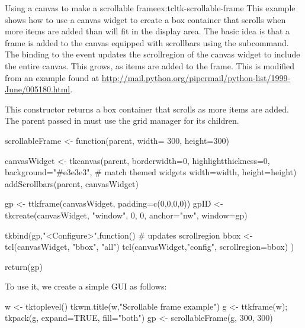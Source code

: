 \begin{example}{Using a canvas to make a scrollable frame}{ex:tcltk-scrollable-frame}
This example shows how to use a canvas widget to create a box
container that scrolls when more items are added than will fit in the
display area. The basic idea is that a frame is added to the canvas
equipped with scrollbars using the  subcommand. The binding to the 
event updates the scrollregion of the canvas widget to include the
entire canvas. This grows, as items are added to the frame. This is
modified from an example found at \url{
  http://mail.python.org/pipermail/python-list/1999-June/005180.html}.

This constructor returns a box container that scrolls as more items are added. The parent passed in must use the grid manager for its children.
\begin{Schunk}
\begin{Sinput}
 scrollableFrame <- function(parent, width= 300, height=300) {
   canvasWidget <- 
     tkcanvas(parent,
              borderwidth=0, highlightthickness=0,
              background="#e3e3e3", # match themed widgets
              width=width, height=height)
   addScrollbars(parent, canvasWidget)
 
   gp <- ttkframe(canvasWidget, padding=c(0,0,0,0))
   gpID <- tkcreate(canvasWidget, "window", 0, 0, anchor="nw", 
                    window=gp)
   
   tkbind(gp,"<Configure>",function() {  # updates scrollregion
     bbox <- tcl(canvasWidget, "bbox", "all")
     tcl(canvasWidget,"config", scrollregion=bbox)
   })
 
   return(gp)
 }
\end{Sinput}
\end{Schunk}

To use it, we create a simple GUI as follows:
\begin{Schunk}
\begin{Sinput}
 w <- tktoplevel()
 tkwm.title(w,"Scrollable frame example")
 g <- ttkframe(w); tkpack(g, expand=TRUE, fill="both")
 gp <- scrollableFrame(g, 300, 300)
\end{Sinput}
\end{Schunk}


\end{example}
